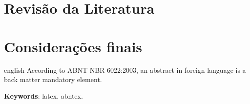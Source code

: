 \documentclass[
	article,			%
	11pt,				%
	oneside,			%
	a4paper,			%
	english,			%
	brazil,				%
	sumario=tradicional
	]{abntex2}
\begin{document}
\section*{Revisão da Literatura}

% 

\section*{Considerações finais}

\postextual



\emptythanks
\maketitle

\renewcommand{\resumoname}{Abstract}
\begin{resumoumacoluna}
 \begin{otherlanguage*}{english}
   According to ABNT NBR 6022:2003, an abstract in foreign language is a back
   matter mandatory element.

   \vspace{\onelineskip}
 
   \noindent
   \textbf{Keywords}: latex. abntex.
 \end{otherlanguage*}  
\end{resumoumacoluna}




%
%
\end{document}
